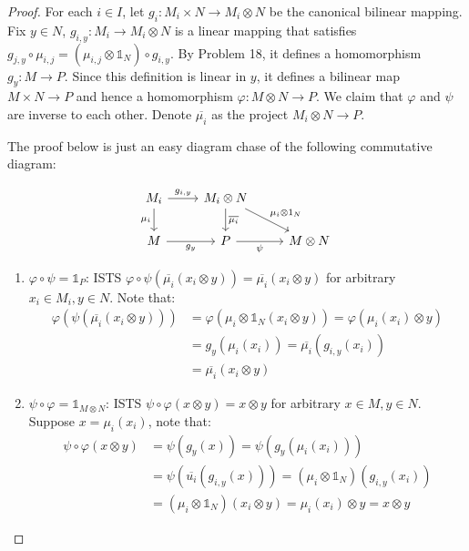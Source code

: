 \documentclass{solution}
\begin{document}
\begin{proof}
    For each $i \in I$, let $g_i: M_i \times N \rightarrow M_i \otimes N$ be the canonical bilinear mapping. Fix $y \in N$, $g_{i, y}: M_i \rightarrow M_i \otimes N$ is a linear mapping that satisfies $g_{j, y} \circ \mu_{i, j} = (\mu_{i, j} \otimes \mathds{1}_N) \circ g_{i, y}$. By Problem 18, it defines a homomorphism $g_y: M \rightarrow P$. Since this definition is linear in $y$, it defines a bilinear map $M \times N \rightarrow P$ and hence a homomorphism $\varphi: M \otimes N \rightarrow P$. We claim that $\varphi$ and $\psi$ are inverse to each other. Denote $\overline{\mu_i}$ as the project $M_i \otimes N \rightarrow P$.

    The proof below is just an easy diagram chase of the following commutative diagram:

    \[\begin{tikzcd}
        {M_i} & {M_i\otimes N} \\
        M & P & {M\otimes N}
        \arrow["{g_{i, y}}", from=1-1, to=1-2]
        \arrow["{\mu_i}"', from=1-1, to=2-1]
        \arrow["{\overline{\mu_i}}", from=1-2, to=2-2]
        \arrow["{\mu_i \otimes 1_N}", from=1-2, to=2-3]
        \arrow["{g_y}"', from=2-1, to=2-2]
        \arrow["\psi"', from=2-2, to=2-3]
    \end{tikzcd}\]

    \begin{enumerate}
        \item $\varphi \circ \psi = \mathds{1}_P$: ISTS $\varphi \circ \psi(\overline{\mu_i}(x_i \otimes y)) = \overline{\mu_i}(x_i \otimes y)$ for arbitrary $x_i \in M_i, y \in N$. Note that:
        $$
            \begin{aligned}
            \varphi(\psi(\overline{\mu_i}(x_i \otimes y))) &= \varphi(\mu_i \otimes \mathds{1}_N(x_i \otimes y)) = \varphi(\mu_i(x_i) \otimes y) \\
            &= g_y(\mu_i(x_i)) = \overline{\mu_i} (g_{i, y}(x_i))\\
            &= \overline{\mu_i}(x_i \otimes y)
            \end{aligned}
        $$
        \item $\psi \circ \varphi = \mathds{1}_{M \otimes N}$: ISTS $\psi \circ \varphi(x \otimes y) = x \otimes y$ for arbitrary $x \in M, y \in N$. Suppose $x = \mu_i(x_i)$, note that:
        $$
            \begin{aligned}
            \psi \circ \varphi(x \otimes y) &= \psi (g_y(x)) = \psi (g_y(\mu_i(x_i))) \\
            &= \psi(\overline{u_i}(g_{i, y}(x))) = (\mu_i \otimes \mathds{1}_N)(g_{i, y}(x_i)) \\
            &= (\mu_i \otimes \mathds{1}_N)(x_i \otimes y) = \mu_i(x_i) \otimes y = x \otimes y
            \end{aligned}
        $$
    \end{enumerate}
\end{proof}
\end{document}
